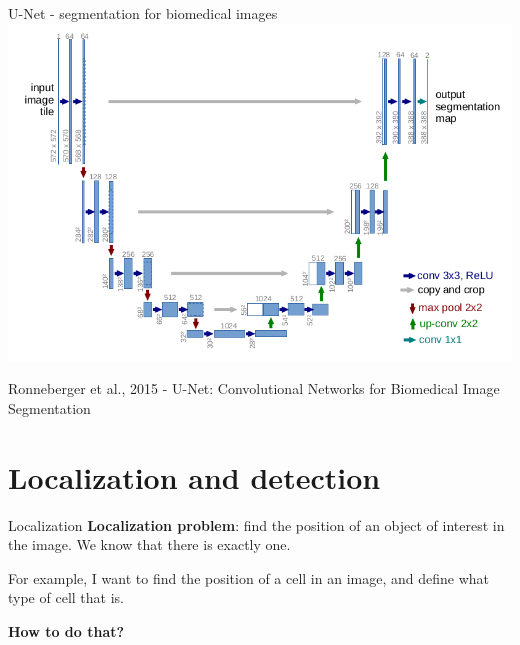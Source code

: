 \documentclass[9pt, aspectratio=169]{beamer}
\begin{document}
\begin{frame}
    {U-Net - segmentation for biomedical images}
    \centering
    \includegraphics[width=.8\textwidth]{Ronneberger 2015 - UNet.png}

    \footnotesize
    Ronneberger et al., 2015 - U-Net: Convolutional Networks for Biomedical Image Segmentation
\end{frame}

\section {Localization and detection}

\begin{frame}
    {Localization}
    \textbf{Localization problem}: find the position of an object of interest in the image. We know that there is exactly one.

    For example, I want to find the position of a cell in an image, and define what type of cell that is.

    \vspace{3em}

    \centering
    \Large
    \textbf{How to do that?}
\end{frame}
\end{document}
